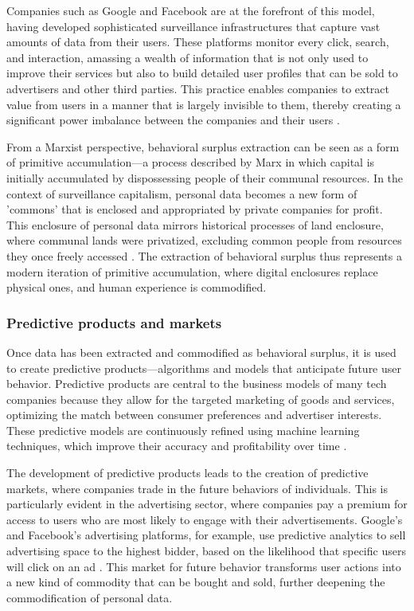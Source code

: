 \begin{refsection}
Companies such as Google and Facebook are at the forefront of this model, having developed sophisticated surveillance infrastructures that capture vast amounts of data from their users. These platforms monitor every click, search, and interaction, amassing a wealth of information that is not only used to improve their services but also to build detailed user profiles that can be sold to advertisers and other third parties. This practice enables companies to extract value from users in a manner that is largely invisible to them, thereby creating a significant power imbalance between the companies and their users \cite[pp.~125-128]{couldry2019data}.

From a Marxist perspective, behavioral surplus extraction can be seen as a form of primitive accumulation—a process described by Marx in which capital is initially accumulated by dispossessing people of their communal resources. In the context of surveillance capitalism, personal data becomes a new form of 'commons' that is enclosed and appropriated by private companies for profit. This enclosure of personal data mirrors historical processes of land enclosure, where communal lands were privatized, excluding common people from resources they once freely accessed \cite[pp.~874-876]{marx2008capital}. The extraction of behavioral surplus thus represents a modern iteration of primitive accumulation, where digital enclosures replace physical ones, and human experience is commodified.

\subsubsection{Predictive products and markets}

Once data has been extracted and commodified as behavioral surplus, it is used to create predictive products—algorithms and models that anticipate future user behavior. Predictive products are central to the business models of many tech companies because they allow for the targeted marketing of goods and services, optimizing the match between consumer preferences and advertiser interests. These predictive models are continuously refined using machine learning techniques, which improve their accuracy and profitability over time \cite[pp.~147-150]{pasquale2016black}.

The development of predictive products leads to the creation of predictive markets, where companies trade in the future behaviors of individuals. This is particularly evident in the advertising sector, where companies pay a premium for access to users who are most likely to engage with their advertisements. Google's and Facebook's advertising platforms, for example, use predictive analytics to sell advertising space to the highest bidder, based on the likelihood that specific users will click on an ad \cite[pp.~113-116]{turow2013daily}. This market for future behavior transforms user actions into a new kind of commodity that can be bought and sold, further deepening the commodification of personal data.


\end{refsection}
